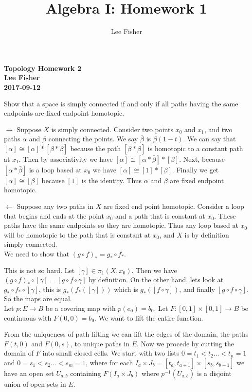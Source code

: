 \documentclass[12pt]{report}
\title{\textbf{Algebra I: Homework 1}}
\author{Lee Fisher}
\date{}
\begin{document}
\textbf{Topology Homework 2}\\
  \textbf{Lee Fisher}\\
  \textbf{2017-09-12}


 Show that a space is simply connected if and only if
all paths having the same endpoints are fixed endpoint homotopic.

$\rightarrow$ Suppose $X$ is simply connected. Consider two points $x_0$ and
$x_1$, and two paths $\alpha$ and $\beta$ connecting the points. We say
$\bar{\beta}$ is $\beta(1-t)$. We can say that $[\alpha] \cong [\alpha] *
[\bar{\beta} * \beta]$ because the path $[\bar{\beta} * \beta]$ is homotopic to
a constant path at $x_1$. Then by associativity we have $[\alpha] \cong [\alpha
* \bar{\beta}] * [\beta]$. Next, because $[\alpha *\bar{\beta}]$ is a loop
based at $x_0$ we have $[\alpha] \cong [1] * [\beta]$. Finally we get $[\alpha]
\cong [\beta]$ because $[1]$ is the identity. Thus $\alpha$ and $\beta$ are
fixed endpoint homotopic.

$\leftarrow$ Suppose any two paths in $X$ are fixed end point homotopic.
Consider a loop that begins and ends at the point $x_0$ and a path that is
constant at $x_0$. These paths have the same endpoints so they are homotopic.
Thus any loop based at $x_0$ will be homotopic to the path that is constant at
$x_0$, and $X$ is by definition simply connected.\\

 We need to show that $(g \circ f)_* = g_* \circ f_*$.

This is not so hard. Let $[\gamma] \in \pi_1(X,x_0)$. Then we have $(g \circ
f)_* \circ [\gamma] = [g \circ f \circ \gamma]$ by definition. On the other
hand, lets look at $g_* \circ f_* \circ [\gamma]$, this is $g_* (f_*([\gamma]))$
which is $g_*([f \circ \gamma])$, and finally $[g \circ f \circ \gamma]$. So the
maps are equal.\\

 Let $p:E \to B$ be a covering map with $p(e_0) =
b_0$. Let $F:[0,1]\times [0,1] \to B$ be continuous with $F(0,0) = b_0$. We want
to lift the entire function.

From the uniqueness of path lifting we can lift the edges of the domain, the
paths $F(t,0)$ and $F(0,s)$, to unique paths in $E$. Now we procede by cutting
the domain of $F$ into small closed cells. We start with two lists $0=t_1 < t_2
\dots < t_n = 1$ and $0 = s_1 < s_2 \dots < s_m =1$, where for each $I_a \times
J_b = [t_a,t_{a+1}] \times [s_b,s_{b+1}]$ we have an open set $U_{a,b}$
containing $F(I_a \times J_b)$ where $p^{-1}(U_{a,b})$ is a disjoint union of
open sets in $E$.
\end{document}
